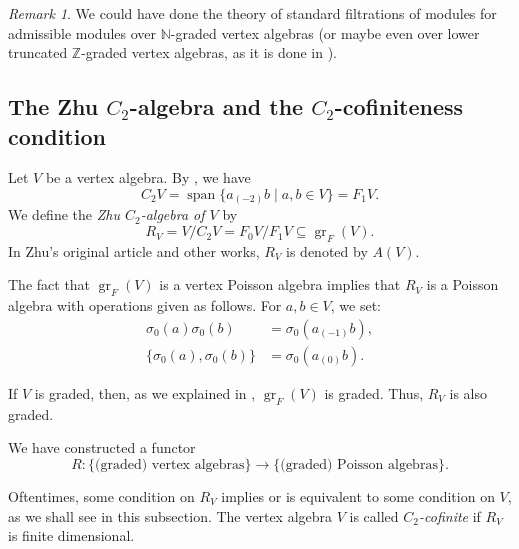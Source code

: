 \documentclass[a4paper, 12pt, reqno]{amsart}
\theoremstyle{remark}
\newtheorem{remark}[theorem]{Remark}
\DeclareMathOperator{\gr}{gr}
\DeclareMathOperator{\vspan}{span}
\begin{document}
\begin{remark}
  \label{rmk:45}
  We could have done the theory of standard filtrations of modules for admissible modules over $\mathbb{N}$-graded vertex algebras (or maybe even over lower truncated $\mathbb{Z}$-graded vertex algebras, as it is done in \cite{li_vertex_2004}).
\end{remark}

\subsection{The Zhu $C_2$-algebra and the $C_2$-cofiniteness condition}
\label{sec:zhu-c_2-algebra}

Let $V$ be a vertex algebra.
By , we have
\begin{equation*}
  C_2V = \vspan\{a_{(-2)}b \mid a, b \in V\} = F_1V.
\end{equation*}
We define the \emph{Zhu $C_2$-algebra of $V$} by
\begin{equation*}
  R_V = V/C_2V = F_0V/F_1V \subseteq \gr_F(V).
\end{equation*}
In Zhu's original article \cite{zhu_modular_1996} and other works, $R_V$ is denoted by $A(V)$.

The fact that $\gr_F(V)$ is a vertex Poisson algebra implies that $R_V$ is a Poisson algebra with operations given as follows.
For $a, b \in V$, we set:
\begin{align*}
  \sigma_0(a)\sigma_0(b) &= \sigma_0(a_{(-1)}b), \\
  \{\sigma_0(a), \sigma_0(b)\} &= \sigma_0(a_{(0)}b).
\end{align*}

If $V$ is graded, then, as we explained in , $\gr_F(V)$ is graded.
Thus, $R_V$ is also graded.

We have constructed a functor
\begin{equation*}
  R: \{\text{(graded) vertex algebras}\} \to \{\text{(graded) Poisson algebras}\}.
\end{equation*}

Oftentimes, some condition on $R_V$ implies or is equivalent to some condition on $V$, as we shall see in this subsection.
The vertex algebra $V$ is called \emph{$C_2$-cofinite} if $R_V$ is finite dimensional.
\end{document}
